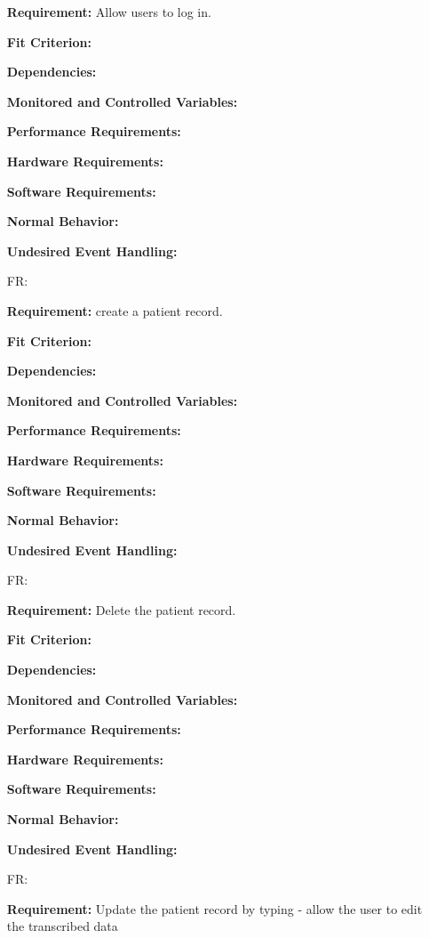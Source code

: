 \documentclass[12pt]{article}
\newcounter{reqnum} %
\begin{document}
\begin{itemize}
\textbf{Requirement:} Allow users to log in.

\textbf{Fit Criterion:}  

\textbf{Dependencies:}  

\textbf{Monitored and Controlled Variables:} 

\textbf{Performance Requirements:} 

\textbf{Hardware Requirements:} 

\textbf{Software Requirements:} 

\textbf{Normal Behavior:} 

\textbf{Undesired Event Handling:} 


\item[FR\refstepcounter{reqnum}\thereqnum \label{FR_meaningfulLabel}:] 

\textbf{Requirement:} create a patient record.

\textbf{Fit Criterion:}  

\textbf{Dependencies:}  

\textbf{Monitored and Controlled Variables:} 

\textbf{Performance Requirements:} 

\textbf{Hardware Requirements:} 

\textbf{Software Requirements:} 

\textbf{Normal Behavior:} 

\textbf{Undesired Event Handling:} 

\item[FR\refstepcounter{reqnum}\thereqnum \label{FR_meaningfulLabel}:] 

\textbf{Requirement:} Delete the patient record.

\textbf{Fit Criterion:}  

\textbf{Dependencies:}  

\textbf{Monitored and Controlled Variables:} 

\textbf{Performance Requirements:} 

\textbf{Hardware Requirements:} 

\textbf{Software Requirements:} 

\textbf{Normal Behavior:} 

\textbf{Undesired Event Handling:} 

\item[FR\refstepcounter{reqnum}\thereqnum \label{FR_meaningfulLabel}:] 

\textbf{Requirement:} Update the patient record by typing - allow the user to edit the transcribed data


\end{itemize}
\end{document}
